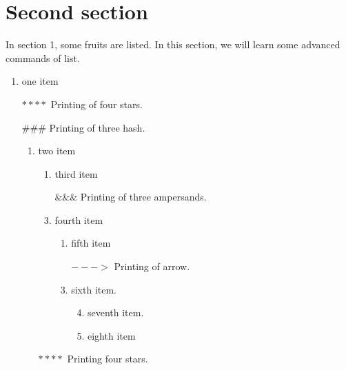 \documentclass[12pt]{article}
\begin{document}
\section{Second section}\label{sec2}
In section 1, some fruits are listed. In this section, we will learn some advanced commands of list.
\begin{enumerate}[label={(\alph*)}]
\item one item 
\item[$****$]Printing of four stars. 
\item[$\#\#\#$]Printing of three hash.
\begin{enumerate}[label={(\alph*)}]
\item two item
\begin{enumerate}[label={(\arabic*)}]
\item third item 
\item [$\&\&\&$]Printing of three ampersands.
\item fourth item
\begin{enumerate}[label={(\roman*)}]
\item fifth item 
\item[$--- >$]Printing of arrow.
\item sixth item.
\begin{enumerate}[label={\Alph*}]
\setcounter{enumiv}{3}
\item seventh item.
\item eighth item
\end{enumerate}
\end{enumerate}
\end{enumerate}
\item[$****$]Printing four stars.
\end{enumerate}
\end{enumerate}
\newpage
\end{document}
